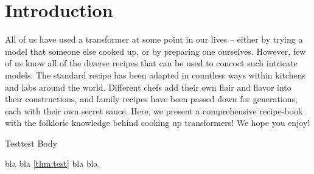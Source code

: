 %
\chapter{Introduction}
%

All of us have used a transformer at some point in our lives -- either by trying a model that someone else cooked up, or by preparing one ourselves. 
However, few of us know all of the diverse recipes that can be used to concoct such intricate models. 
The standard recipe \citep{vaswani-etal-2017-attention} has been adapted in countless ways within kitchens and labs around the world. 
Different chefs add their own flair and flavor into their constructions, and family recipes have been passed down for generations, each with their own secret sauce. 
Here, we present a comprehensive recipe-book with the folkloric knowledge behind cooking up transformers! 
We hope you enjoy!

\begin{theorem}{Test}{test}
    Body 
\end{theorem}

 bla bla \cref{thm:test} bla bla. 